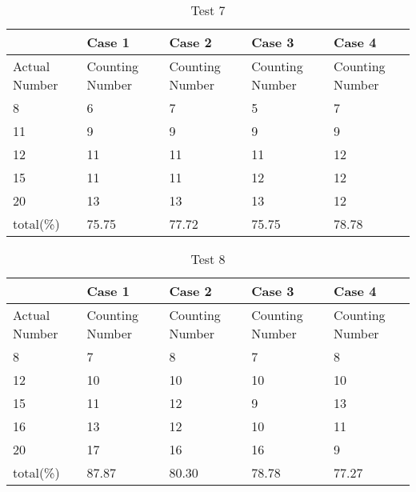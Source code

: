\begin{table}[t]
	\centering
	\begin{tabular}{|p{1.5cm}|p{1.5cm}|p{1.5cm}|p{1.5cm}|p{1.5cm}|}
		\hline
		& Case 1 & Case 2 & Case 3 & Case 4\\
		\hline
		Actual Number & Counting Number & Counting Number & Counting Number & Counting Number\\
		\hline
	8	& 	6	&  	7	&  	5	& 7	\\
	11	& 	 9	& 	9	& 	9	& 9	\\
	12	& 	11	&	11	& 	11	& 12	\\
	15	& 	11	& 	11	& 	12	& 12\\
	20	& 	13	& 	13	& 	13	& 12	\\
		total(\%)& 	75.75	&	77.72	&	75.75	& 78.78\\
		\hline
	\end{tabular}
	\caption{Test 7} \label{teb:test807}
\end{table}
\begin{table}[t]
	\centering
	\begin{tabular}{|p{1.5cm}|p{1.5cm}|p{1.5cm}|p{1.5cm}|p{1.5cm}|}
		\hline
		& Case 1 & Case 2 & Case 3 & Case 4\\
		\hline
		Actual Number & Counting Number & Counting Number & Counting Number & Counting Number\\
		\hline
	8	& 	7	&  	8	&  	7	& 8	\\
	12	& 	 10	& 	10	& 	10	& 10	\\
	15	& 	11	&	12	& 	9	& 	13\\
	16	& 	13	& 	12	& 	10	& 	11\\
	20	& 	17	& 	16	& 	16	& 	9\\
		total(\%)& 	87.87	&	80.30	&	78.78	& 77.27 \\
		\hline
	\end{tabular}
	\caption{Test 8} \label{teb:test808}
\end{table}

